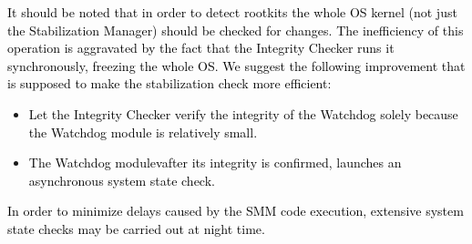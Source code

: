 \textcolor{black}{It should be noted that in order to detect rootkits
the whole OS kernel (not just the Stabilization Manager) should be
checked for changes. The inefficiency of this operation is aggravated
by the fact that the Integrity Checker runs it synchronously, freezing
the whole OS. We suggest the following improvement that is supposed
to make the stabilization check more efficient:}
\begin{itemize}
\item \textcolor{black}{Let the Integrity Checker verify the integrity of
the Watchdog solely because the Watchdog module is relatively small.}
\item \textcolor{black}{The Watchdog modulevafter its integrity is confirmed,
launches an asynchronous system state check. }
\end{itemize}
\textcolor{black}{In order to minimize delays caused by the SMM code
execution, extensive system state checks may be carried out at night
time.}
